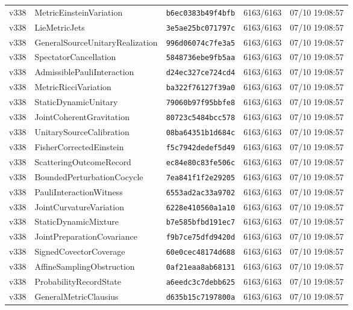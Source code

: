 \documentclass[11pt]{article}
\theoremstyle{definition}\newtheorem{deriv}{Derivation}
\begin{document}
{\begin{longtable}{@{}lllll@{}}
v338 & MetricEinsteinVariation & \texttt{b6ec0383b49f4bfb} & 6163/6163 & 07/10 19:08:57 \\
v338 & LieMetricJets & \texttt{3e5ae25bc071797c} & 6163/6163 & 07/10 19:08:57 \\
v338 & GeneralSourceUnitaryRealization & \texttt{996d06074c7fe3a5} & 6163/6163 & 07/10 19:08:57 \\
v338 & SpectatorCancellation & \texttt{5848736ebe9fb5aa} & 6163/6163 & 07/10 19:08:57 \\
v338 & AdmissiblePauliInteraction & \texttt{d24ec327ce724cd4} & 6163/6163 & 07/10 19:08:57 \\
v338 & MetricRicciVariation & \texttt{ba322f76127f39a0} & 6163/6163 & 07/10 19:08:57 \\
v338 & StaticDynamicUnitary & \texttt{79060b97f95bbfe8} & 6163/6163 & 07/10 19:08:57 \\
v338 & JointCoherentGravitation & \texttt{80723c5484bcc578} & 6163/6163 & 07/10 19:08:57 \\
v338 & UnitarySourceCalibration & \texttt{08ba64351b1d684c} & 6163/6163 & 07/10 19:08:57 \\
v338 & FisherCorrectedEinstein & \texttt{f5c7942dedef5d49} & 6163/6163 & 07/10 19:08:57 \\
v338 & ScatteringOutcomeRecord & \texttt{ec84e80c83fe506c} & 6163/6163 & 07/10 19:08:57 \\
v338 & BoundedPerturbationCocycle & \texttt{7ea841f1f2e29205} & 6163/6163 & 07/10 19:08:57 \\
v338 & PauliInteractionWitness & \texttt{6553ad2ac33a9702} & 6163/6163 & 07/10 19:08:57 \\
v338 & JointCurvatureVariation & \texttt{6228e410560a1a10} & 6163/6163 & 07/10 19:08:57 \\
v338 & StaticDynamicMixture & \texttt{b7e585bfbd191ec7} & 6163/6163 & 07/10 19:08:57 \\
v338 & JointPreparationCovariance & \texttt{f9b7ce75dfd9420d} & 6163/6163 & 07/10 19:08:57 \\
v338 & SignedCovectorCoverage & \texttt{60e0cec48174d688} & 6163/6163 & 07/10 19:08:57 \\
v338 & AffineSamplingObstruction & \texttt{0af21eaa8ab68131} & 6163/6163 & 07/10 19:08:57 \\
v338 & ProbabilityRecordState & \texttt{a6eedc3c7debb625} & 6163/6163 & 07/10 19:08:57 \\
v338 & GeneralMetricClausius & \texttt{d635b15c7197800a} & 6163/6163 & 07/10 19:08:57 \\

\end{longtable}}
\end{document}
